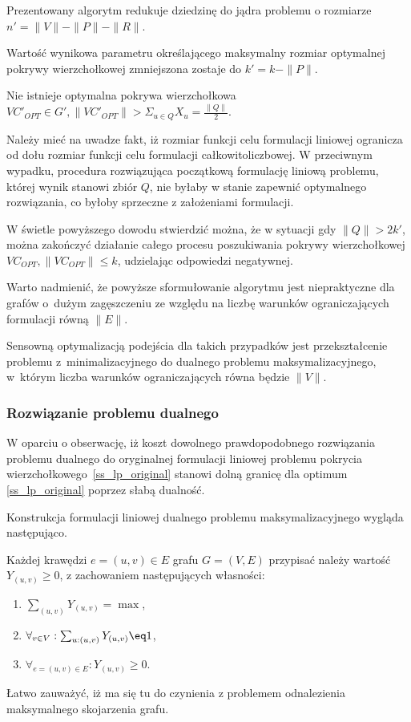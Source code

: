 Prezentowany algorytm redukuje dziedzinę do jądra problemu  o rozmiarze
$n\prime=\|V\|-\|P\|-\|R\|$.

Wartość wynikowa parametru określającego maksymalny rozmiar optymalnej pokrywy
wierzchołkowej zmniejszona zostaje do $k\prime=k-\|P\|$.

\begin{theorem}
  Nie istnieje optymalna pokrywa wierzchołkowa $VC\prime_{OPT}\in G\prime,\|VC\prime_{OPT}\|>\Sigma_{u\in Q}X_u=\frac{\|Q\|}{2}$.
\end{theorem}
\begin{bproof}
  Należy mieć na uwadze fakt, iż rozmiar funkcji celu formulacji liniowej 
  ogranicza od dołu rozmiar funkcji celu formulacji całkowitoliczbowej.
  W przeciwnym wypadku, procedura rozwiązująca początkową formulację liniową
  problemu, której wynik stanowi zbiór $Q$, nie byłaby w stanie zapewnić
  optymalnego rozwiązania, co byłoby sprzeczne z założeniami formulacji.
\end{bproof}

W świetle powyższego dowodu stwierdzić można, że w sytuacji gdy
$\|Q\|>2k\prime$, można zakończyć działanie całego procesu poszukiwania pokrywy
wierzchołkowej $VC_{OPT}, \|VC_{OPT}\|\leq k$, udzielając odpowiedzi negatywnej.

Warto nadmienić, że powyższe sformułowanie algorytmu jest niepraktyczne dla
grafów o~dużym zagęszczeniu ze względu na liczbę warunków ograniczających 
formulacji równą $\|E\|$.

Sensowną optymalizacją podejścia dla takich przypadków jest przekształcenie
problemu z~minimalizacyjnego do dualnego problemu maksymalizacyjnego, 
w~którym liczba warunków ograniczających równa będzie $\|V\|$.

\subsubsection{Rozwiązanie problemu dualnego}

W oparciu o obserwację, iż koszt dowolnego prawdopodobnego rozwiązania problemu
dualnego do oryginalnej formulacji liniowej problemu pokrycia
wierzchołkowego~\ref{ss_lp_original} stanowi dolną granicę dla optimum
\ref{ss_lp_original} poprzez słabą dualność. 

Konstrukcja formulacji liniowej dualnego problemu maksymalizacyjnego wygląda
następująco.

Każdej krawędzi $e=(u,v) \in E$ grafu $G=(V,E)$ przypisać należy wartość
$Y_(u,v) \geq 0$, z zachowaniem następujących własności:
\begin{enumerate}
  \item $\sum_{(u,v)}Y_{(u,v)} = \max$,
  \item $\forall_{v \in V}:\sum_{u:(u,v)}Y_{(u,v)}\eq 1$,
  \item $\forall_{e=(u,v) \in E}: Y_{(u,v)} \geq 0$.
\end{enumerate}

Łatwo zauważyć, iż ma się tu do czynienia z problemem odnalezienia maksymalnego
skojarzenia grafu.
